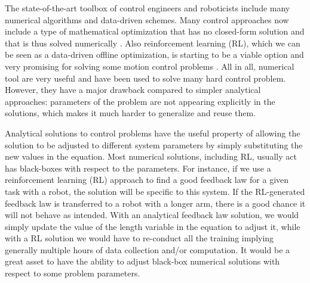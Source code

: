 


The state-of-the-art toolbox of control engineers and roboticists include many numerical algorithms and data-driven schemes. Many control approaches now include a type of mathematical optimization that has no closed-form solution and that is thus solved numerically \cite{kuindersma_optimization-based_2016}. Also reinforcement learning (RL), which we can be seen as a data-driven offline optimization, is starting to be a viable option and very promising for solving some motion control problems \cite{rudin_learning_2022}. All in all, numerical tool are very useful and have been used to solve many hard control problem. However, they have a major drawback compared to simpler analytical approaches: parameters of the problem are not appearing explicitly in the solutions, which makes it much harder to generalize and reuse them. 

Analytical solutions to control problems have the useful property of allowing the solution to be adjusted to different system parameters by simply substituting the new values in the equation. Most numerical solutions, including RL, usually act has black-boxes with respect to the parameters. For instance, if we use a reinforcement learning (RL) approach to find a good feedback law for a given task with a robot, the solution will be specific to this system. If the RL-generated feedback law is transferred to a robot with a longer arm, there is a good chance it will not behave as intended. With an analytical feedback law solution, we would simply update the value of the length variable in the equation to adjust it, while with a RL solution we would have to re-conduct all the training implying generally multiple hours of data collection and/or computation. It would be a great asset to have the ability to adjust black-box numerical solutions with respect to some problem parameters.  

